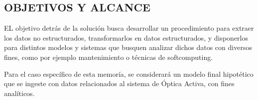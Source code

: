 \subsection{OBJETIVOS Y ALCANCE}

EL objetivo detrás de la solución busca desarrollar un procedimiento para extraer los datos no estructurados, transformarlos en datos estructurados, y disponerlos para distintos modelos y sistemas
que busquen analizar dichos datos con diversos fines, como por ejemplo mantenimiento o técnicas de softcomputing.

Para el caso específico de esta memoría, se considerará un modelo final hipotético que se ingeste con datos relacionados al sistema de Óptica Activa, con fines analíticos.
